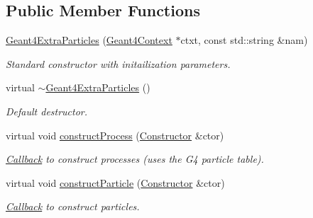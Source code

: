 \subsection*{Public Member Functions}
\begin{DoxyCompactItemize}
\item 
\hyperlink{class_d_d4hep_1_1_simulation_1_1_geant4_extra_particles_a6010ec49bacd3f02f24ee026fe0aac3f}{Geant4ExtraParticles} (\hyperlink{class_d_d4hep_1_1_simulation_1_1_geant4_context}{Geant4Context} $\ast$ctxt, const std::string \&nam)
\begin{DoxyCompactList}\small\item\em Standard constructor with initailization parameters. \item\end{DoxyCompactList}\item 
virtual \hyperlink{class_d_d4hep_1_1_simulation_1_1_geant4_extra_particles_aca6485d81b22fb87183c62b06da3df17}{$\sim$Geant4ExtraParticles} ()
\begin{DoxyCompactList}\small\item\em Default destructor. \item\end{DoxyCompactList}\item 
virtual void \hyperlink{class_d_d4hep_1_1_simulation_1_1_geant4_extra_particles_aa87e3c12da9259e49a15a35a5c76698c}{constructProcess} (\hyperlink{class_d_d4hep_1_1_simulation_1_1_geant4_physics_constructor_1_1_constructor}{Constructor} \&ctor)
\begin{DoxyCompactList}\small\item\em \hyperlink{class_d_d4hep_1_1_callback}{Callback} to construct processes (uses the G4 particle table). \item\end{DoxyCompactList}\item 
virtual void \hyperlink{class_d_d4hep_1_1_simulation_1_1_geant4_extra_particles_ad256c3419ba5c43c223157434f74ae49}{constructParticle} (\hyperlink{class_d_d4hep_1_1_simulation_1_1_geant4_physics_constructor_1_1_constructor}{Constructor} \&ctor)
\begin{DoxyCompactList}\small\item\em \hyperlink{class_d_d4hep_1_1_callback}{Callback} to construct particles. \item\end{DoxyCompactList}\end{DoxyCompactItemize}
